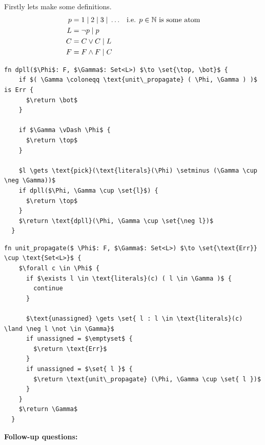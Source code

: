 \documentclass[../main.tex]{subfiles}
\begin{document}

Firstly lets make some definitions.
\begin{align*}
	p & = 1 \; \vert \; 2 \; \vert \; 3 \; \vert \; \ldots &  & \text{i.e. $p \in \mathbb{N}$ is some atom} \\
	L & = \neg p \; \vert \; p                                                            \\
	C & = C \lor C \; \vert \; L                                                          \\
	F & = F \land F \; \vert \; C
\end{align*}


\begin{algorithm}
	\caption{DPLL}
	\begin{lstlisting}[style=pseudo]
  fn dpll($\Phi$: F, $\Gamma$: Set<L>) $\to \set{\top, \bot}$ {
    if $( \Gamma \coloneqq \text{unit\_propagate} ( \Phi, \Gamma ) )$ is Err {
      $\return \bot$ 
    }

    if $\Gamma \vDash \Phi$ {
      $\return \top$ 
    }

    $l \gets \text{pick}(\text{literals}(\Phi) \setminus (\Gamma \cup \neg \Gamma))$
    if dpll($\Phi, \Gamma \cup \set{l}$) {
      $\return \top$
    }
    $\return \text{dpll}(\Phi, \Gamma \cup \set{\neg l})$
  }
\end{lstlisting}
\end{algorithm}

\begin{algorithm}
	\caption{Unit Propagate}
	\begin{lstlisting}[style=pseudo]
  fn unit_propagate($ \Phi$: F, $\Gamma$: Set<L>) $\to \set{\text{Err}} \cup \text{Set<L>}$ {
    $\forall c \in \Phi$ {
      if $\exists l \in \text{literals}(c) ( l \in \Gamma )$ {
        continue
      }

      $\text{unassigned} \gets \set{ l : l \in \text{literals}(c) \land \neg l \not \in \Gamma}$  
      if unassigned = $\emptyset$ {
        $\return \text{Err}$
      }
      if unassigned = $\set{ l }$ {
        $\return \text{unit\_propagate} (\Phi, \Gamma \cup \set{ l })$ 
      }
    }
    $\return \Gamma$
  }
\end{lstlisting}
\end{algorithm}

\textbf{Follow-up questions:}
\end{document}
